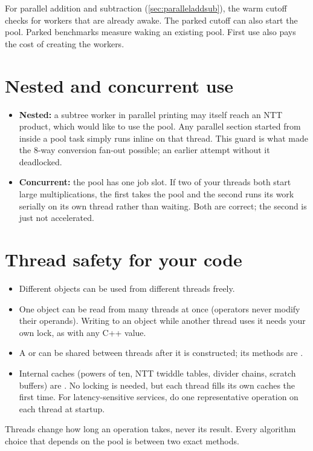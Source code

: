 For parallel addition and subtraction (\cref{sec:paralleladdsub}), the warm
cutoff checks for workers that are already awake. The parked cutoff can also
start the pool. Parked benchmarks measure waking an existing pool. First use
also pays the cost of creating the workers.

\section{Nested and concurrent use}

\begin{itemize}
  \item \textbf{Nested:} a subtree worker in parallel printing may itself reach an NTT product,
        which would like to use the pool. Any parallel section started from inside a pool task
        simply runs inline on that thread. This guard is what made the 8-way conversion
        fan-out possible; an earlier attempt without it deadlocked.
  \item \textbf{Concurrent:} the pool has one job slot. If two of your threads both start large
        multiplications, the first takes the pool and the second runs its work serially on its
        own thread rather than waiting. Both are correct; the second is just not accelerated.
\end{itemize}

\section{Thread safety for your code}

\begin{itemize}
  \item Different  objects can be used from different threads freely.
  \item One object can be read from many threads at once (operators never modify their
        operands). Writing to an object while another thread uses it needs your own lock, as
        with any C++ value.
  \item A  or  can be shared between threads
        after it is constructed; its methods are .
  \item Internal caches (powers of ten, NTT twiddle tables, divider chains, scratch buffers)
        are . No locking is needed, but each thread fills its own caches the
        first time. For latency-sensitive services, do one representative operation on each
        thread at startup.
\end{itemize}

\begin{keyidea}
Threads change how long an operation takes, never its result. Every algorithm choice that
depends on the pool is between two exact methods.
\end{keyidea}

